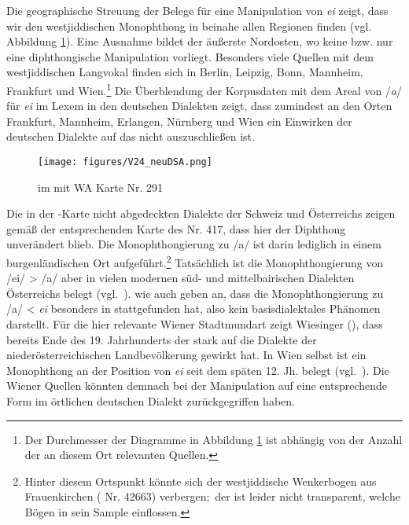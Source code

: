 Die geographische Streuung der Belege für eine Manipulation von {\mhd} \textit{ei} zeigt, dass wir den westjiddischen Monophthong in beinahe allen Regionen finden (vgl.\, Abbildung \ref{karteV24DSA}). Eine Ausnahme bildet der äußerste Nordosten, wo keine bzw. nur eine diphthongische Manipulation vorliegt. Besonders viele Quellen mit dem westjiddischen Langvokal finden sich in Berlin, Leipzig, Bonn, Mannheim, Frankfurt und Wien.\footnote{Der Durchmesser der Diagramme in Abbildung \ref{karteV24DSA} ist abhängig von der Anzahl der an diesem Ort relevanten Quellen.} Die Überblendung der Korpusdaten mit dem Areal von /\textit{a\textlengthmark}/ für {\mhd} \textit{ei} im Lexem  in den deutschen Dialekten zeigt, dass zumindest an den Orten Frankfurt, Mannheim, Erlangen, Nürnberg und Wien ein Einwirken der deutschen Dialekte auf das  nicht auszuschließen ist. 
		
		\begin{figure}
		\centering
\texttt{[image: figures/V24\_neuDSA.png]}
		\caption{\label{karteV24DSA}   im  mit WA Karte Nr. 291}
		\end{figure}
 


Die in der -Karte nicht abgedeckten Dialekte der Schweiz und Österreichs zeigen gemäß der entsprechenden Karte des  Nr. 417, dass hier der {\mhd} Diphthong unverändert blieb. Die Monophthongierung zu /a\textlengthmark/ ist darin lediglich in einem burgenländischen Ort aufgeführt.\footnote{Hinter diesem Ortspunkt könnte sich der westjiddische Wenkerbogen aus Frauenkirchen ( Nr. 42663) verbergen;\, der   ist leider nicht transparent, welche Bögen in sein Sample einflossen.}
Tatsächlich ist die Monophthongierung von {\mhd} /ei/ > /a\textlengthmark/ aber in vielen modernen süd- und mittelbairischen Dialekten Österreichs belegt (vgl.\, \citealt{Wiesinger2001}). \cite[233]{Schirmunski1962} wie auch \cite{Wiesinger2001} geben an, dass die Monophthongierung zu /a\textlengthmark/ < {\mhd} \textit{ei} besonders in  stattgefunden hat, also kein basisdialektales Phänomen darstellt. Für die hier relevante Wiener Stadtmundart zeigt Wiesinger (\citeyear[92f]{Wiesinger2001}), dass bereits Ende des 19. Jahrhunderts der  stark auf die Dialekte der niederösterreichischen Landbevölkerung gewirkt hat. In Wien selbst ist ein Monophthong an der Position von {\mhd} \textit{ei} seit dem späten 12. Jh. belegt (vgl.\, \citealt[113]{Wiesinger2001}). Die Wiener Quellen könnten demnach bei der Manipulation auf eine entsprechende Form im örtlichen deutschen Dialekt zurückgegriffen haben.
 

